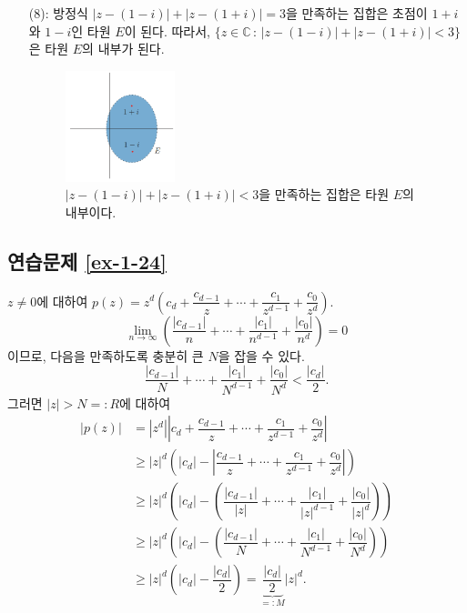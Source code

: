 \begin{itemize}
\item[(8):] 방정식 $|z-(1-i)| + |z-(1+i)| =3$을 만족하는 집합은
초점이 $1+i$와 $1-i$인 타원 $E$이 된다.
따라서, $\{z\in\mathbb C\,:\, |z-(1-i)| + |z-(1+i)| < 3\}$은
타원 $E$의 내부가 된다.
\begin{figure}[h!]
\begin{center}
\includegraphics[width=0.3\textwidth]{./Solution/figs/fig-5-10}
\end{center}
\caption{$|z-(1-i)| + |z-(1+i)| < 3$을 만족하는 집합은 타원  $E$의 내부이다.}
\label{fig-5-10}
\end{figure}
\end{itemize}

\subsection*{연습문제 \ref{ex-1-24}}

$z\ne0$에 대하여
$p(z) = z^d \left( c_d + \dfrac{c_{d-1}}z + \cdots + \dfrac{c_1}{z^{d-1}}
+ \dfrac{c_0}{z^d} \right)$.
\[
\lim_{n\to\infty}  \left( 
 \dfrac{|c_{d-1}|}n + \cdots + \dfrac{|c_1|}{n^{d-1}}
+ \dfrac{|c_0|}{n^d} \right) = 0
\]
이므로, 
다음을  만족하도록 충분히 큰 $N$을 잡을 수 있다.
\[
\dfrac{|c_{d-1}|}N + \cdots + \dfrac{|c_1|}{N^{d-1}}
+ \dfrac{|c_0|}{N^d} < \dfrac{|c_d|}2.
\]
그러면 $|z|>N=:R$에 대하여
\begin{align*}
|p(z)| &= |z^d| \left|
c_d + \dfrac{c_{d-1}}z + \cdots + \dfrac{c_1}{z^{d-1}}
+ \dfrac{c_0}{z^d} \right| \\
&\ge |z|^d \left( |c_d| - \left| \dfrac{c_{d-1}}z + \cdots + \dfrac{c_1}{z^{d-1}}
+ \dfrac{c_0}{z^d} \right| \right) \\
&\ge |z|^d \left(|c_d| - \left( \dfrac{|c_{d-1}|}{|z|} + \cdots + \dfrac{|c_1|}{|z|^{d-1}}
+ \dfrac{|c_0|}{|z|^d} \right) \right) \\
&\ge |z|^d \left(|c_d| - \left( \dfrac{|c_{d-1}|}N + \cdots + \dfrac{|c_1|}{N^{d-1}}
+ \dfrac{|c_0|}{N^d} \right) \right) \\
&\ge |z|^d \left(|c_d| - \dfrac{|c_d|}2 \right) = \underbrace{\dfrac{|c_d|}2}_{=:M} |z|^d.
\end{align*}

